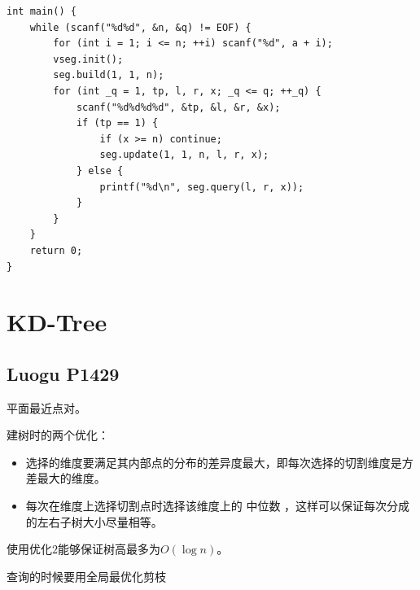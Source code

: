\begin{lstlisting}
int main() {
    while (scanf("%d%d", &n, &q) != EOF) {
        for (int i = 1; i <= n; ++i) scanf("%d", a + i);
        vseg.init();
        seg.build(1, 1, n);
        for (int _q = 1, tp, l, r, x; _q <= q; ++_q) {
            scanf("%d%d%d%d", &tp, &l, &r, &x);
            if (tp == 1) {
                if (x >= n) continue;
                seg.update(1, 1, n, l, r, x);
            } else {
                printf("%d\n", seg.query(l, r, x));
            }
        }
    }
    return 0;
}
\end{lstlisting}

\section{KD-Tree}

\subsection{Luogu P1429}

平面最近点对。\par

建树时的两个优化：
\begin{itemize}
\item 选择的维度要满足其内部点的分布的差异度最大，即每次选择的切割维度是方差最大的维度。
\item 每次在维度上选择切割点时选择该维度上的 中位数 ，这样可以保证每次分成的左右子树大小尽量相等。
\end{itemize}
使用优化$2$能够保证树高最多为$O(\log n)$。\par

查询的时候要用全局最优化剪枝\par

